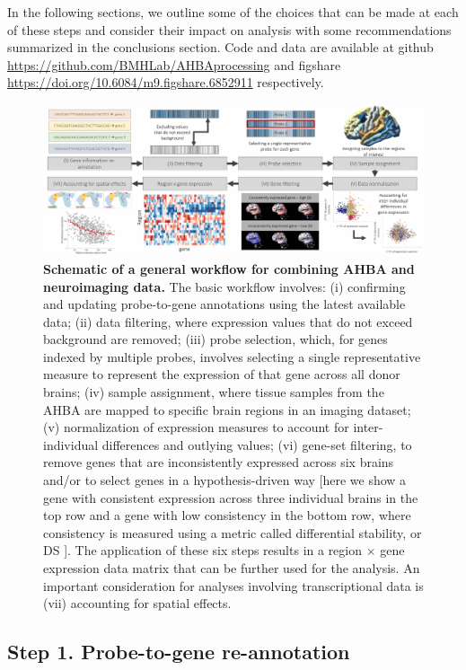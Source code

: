In the following sections, we outline some of the choices that can be made at each of these steps and consider their impact on analysis with some recommendations summarized in the conclusions section. Code and data are available at github \url{https://github.com/BMHLab/AHBAprocessing} and figshare \url{https://doi.org/10.6084/m9.figshare.6852911} respectively.

\begin{figure}[h!]
  \centering
    \includegraphics[width=1\textwidth]{Chapter4/Ch4Fig2.pdf}
\caption{\textbf{Schematic of a general workflow for combining AHBA and neuroimaging data.} The basic workflow involves: (i) confirming and updating probe-to-gene annotations using the latest available data; (ii) data filtering, where expression values that do not exceed background are removed; (iii) probe selection, which, for genes indexed by multiple probes, involves selecting a single representative measure to represent the expression of that gene across all donor brains; (iv) sample assignment, where tissue samples from the AHBA are mapped to specific brain regions in an imaging dataset; (v) normalization of expression measures to account for inter-individual differences and outlying values; (vi) gene-set filtering, to remove genes that are inconsistently expressed across six brains and/or to select genes in a hypothesis-driven way [here we show a gene with consistent expression across three individual brains in the top row and a gene with low consistency in the bottom row, where consistency is measured using a metric called differential stability, or DS \citep{Hawrylycz2015}]. The application of these six steps results in a region $\times$ gene expression data matrix that can be further used for the analysis. An important consideration for analyses involving transcriptional data is (vii) accounting for spatial effects.}

\label{fig:Ch4Fig2}
\end{figure}

\subsection{Step 1. Probe-to-gene re-annotation}

